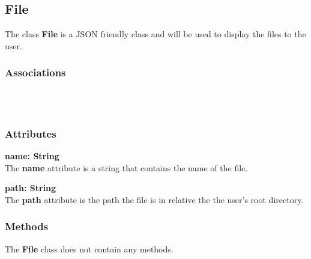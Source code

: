 \subsection{File}
The class \textbf{File} is a JSON friendly class and will be used to display the files to the user.

\subsubsection{Associations}
\textbf{} \\

\textbf{} \\

\subsubsection{Attributes}
\textbf{name: String} \\
The \textbf{name} attribute is a string that contains the name of the file.

\textbf{path: String} \\
The \textbf{path} attribute is the path the file is in relative the the user's
root directory.

\subsubsection{Methods}
The \textbf{File} class does not contain any methods.

